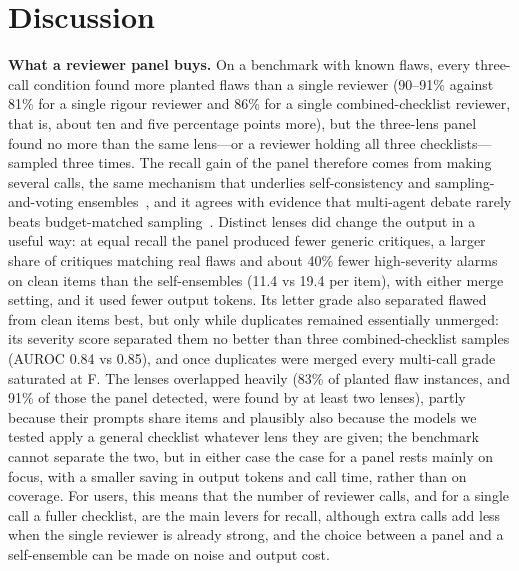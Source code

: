\section*{Discussion}

\textbf{What a reviewer panel buys.} On a benchmark with known flaws, every three-call condition found more planted flaws than a single reviewer (90--91\% against 81\% for a single rigour reviewer and 86\% for a single combined-checklist reviewer, that is, about ten and five percentage points more), but the three-lens panel found no more than the same lens---or a reviewer holding all three checklists---sampled three times. The recall gain of the panel therefore comes from making several calls, the same mechanism that underlies self-consistency and sampling-and-voting ensembles~\cite{wang2023selfconsistency,li2024moreagents}, and it agrees with evidence that multi-agent debate rarely beats budget-matched sampling~\cite{smit2024mad,wang2024rethinking}. Distinct lenses did change the output in a useful way: at equal recall the panel produced fewer generic critiques, a larger share of critiques matching real flaws and about 40\% fewer high-severity alarms on clean items than the self-ensembles (11.4 vs 19.4 per item), with either merge setting, and it used fewer output tokens. Its letter grade also separated flawed from clean items best, but only while duplicates remained essentially unmerged: its severity score separated them no better than three combined-checklist samples (AUROC 0.84 vs 0.85), and once duplicates were merged every multi-call grade saturated at F. The lenses overlapped heavily (83\% of planted flaw instances, and 91\% of those the panel detected, were found by at least two lenses), partly because their prompts share items and plausibly also because the models we tested apply a general checklist whatever lens they are given; the benchmark cannot separate the two, but in either case the case for a panel rests mainly on focus, with a smaller saving in output tokens and call time, rather than on coverage. For users, this means that the number of reviewer calls, and for a single call a fuller checklist, are the main levers for recall, although extra calls add less when the single reviewer is already strong, and the choice between a panel and a self-ensemble can be made on noise and output cost.

